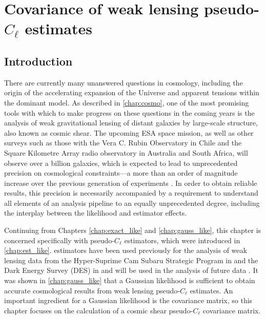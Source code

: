 
% 
% 

% 

\chapter{Covariance of weak lensing pseudo-\texorpdfstring{$C_\ell$}{Cl} estimates}
\label{chap:cov}
\graphicspath{{../Figs/cov/}{Figs/cov/}}

\section{Introduction}

There are currently many unanswered questions in cosmology, including the origin of the accelerating expansion of the Universe and apparent tensions within the dominant \lcdm{} model. As described in \autoref{chap:cosmo}, one of the most promising tools with which to make progress on these questions in the coming years is the analysis of weak gravitational lensing of distant galaxies by large-scale structure, also known as cosmic shear.
The upcoming ESA \Euclid{} space mission, as well as other surveys such as those with the Vera C. Rubin Observatory in Chile and the Square Kilometre Array radio observatory in Australia and South Africa,
will observe over a billion galaxies, which is expected to lead to unprecedented precision on cosmological constraints---a more than an order of magnitude increase over the previous generation of experiments \citep{Harrison2016}. In order to obtain reliable results, this precision is necessarily accompanied by a requirement to understand all elements of an analysis pipeline to an equally unprecedented degree, including the interplay between the likelihood and estimator effects.

Continuing from Chapters \ref{chap:exact_like} and \ref{chap:gauss_like}, this chapter is concerned specifically with pseudo-$C_\ell$ estimators, which were introduced in \autoref{chap:est_like}. \Pcl{} estimators have been used previously for the analysis of weak lensing data from the Hyper-Suprime Cam Subaru Strategic Program in \citet{Hikage2019} and the Dark Energy Survey (DES) in \citet{Camacho2021} and will be used in the analysis of future \Euclid{} data \citep{Loureiro2021}. It was shown in \autoref{chap:gauss_like} that a Gaussian likelihood is sufficient to obtain accurate cosmological results from weak lensing pseudo-$C_\ell$ estimates. An important ingredient for a Gaussian likelihood is the covariance matrix, so this chapter focuses on the calculation of a cosmic shear pseudo-$C_\ell$ covariance matrix.

